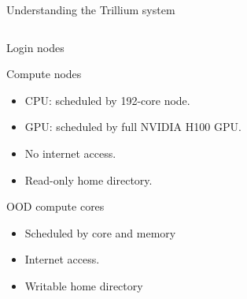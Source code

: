 \documentclass[
  10pt,
  ignorenonframetext,
  aspectratio=169,handout]{beamer}
\providecommand{\tightlist}{%
  \setlength{\itemsep}{0pt}\setlength{\parskip}{0pt}}
\begin{document}
\begin{frame}{Understanding the Trillium system}
\begin{columns}[T]
\begin{column}{0.47\linewidth}
\begin{block}{Login nodes}
\pause
\end{block}

\begin{block}{Compute nodes}\setlength{\parskip}{0.5\baselineskip}
\label{compute-nodes}
\vspace{-1mm}

\begin{itemize}
\tightlist
\item
  CPU: scheduled by 192-core node.
\item
  GPU: scheduled by full NVIDIA H100 GPU.
\item
  No internet access.
\item
  Read-only home directory.
\end{itemize}

\pause
\end{block}

\begin{block}{OOD compute cores}\setlength{\parskip}{0.5\baselineskip}
\label{ood-compute-cores}
\vspace{-1mm}

\begin{itemize}
\tightlist
\item
  Scheduled by core and memory
\item
  Internet access.
\item
  Writable home directory
\end{itemize}
\end{block}
\end{column}
\end{columns}
\end{frame}
\end{document}
